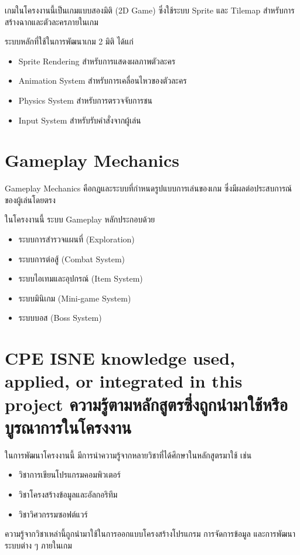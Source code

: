เกมในโครงงานนี้เป็นเกมแบบสองมิติ (2D Game) ซึ่งใช้ระบบ Sprite และ Tilemap สำหรับการสร้างฉากและตัวละครภายในเกม

ระบบหลักที่ใช้ในการพัฒนาเกม 2 มิติ ได้แก่

\begin{itemize}
\item Sprite Rendering สำหรับการแสดงผลภาพตัวละคร
\item Animation System สำหรับการเคลื่อนไหวของตัวละคร
\item Physics System สำหรับการตรวจจับการชน
\item Input System สำหรับรับคำสั่งจากผู้เล่น
\end{itemize}

\section{Gameplay Mechanics}

Gameplay Mechanics คือกฎและระบบที่กำหนดรูปแบบการเล่นของเกม ซึ่งมีผลต่อประสบการณ์ของผู้เล่นโดยตรง

ในโครงงานนี้ ระบบ Gameplay หลักประกอบด้วย

\begin{itemize}
\item ระบบการสำรวจแผนที่ (Exploration)
\item ระบบการต่อสู้ (Combat System)
\item ระบบไอเทมและอุปกรณ์ (Item System)
\item ระบบมินิเกม (Mini-game System)
\item ระบบบอส (Boss System)
\end{itemize}

\section{\ifenglish%
\ifcpe CPE \else ISNE \fi knowledge used, applied, or integrated in this project
\else%
ความรู้ตามหลักสูตรซึ่งถูกนำมาใช้หรือบูรณาการในโครงงาน
\fi
}

ในการพัฒนาโครงงานนี้ มีการนำความรู้จากหลายวิชาที่ได้ศึกษาในหลักสูตรมาใช้ เช่น

\begin{itemize}
\item วิชาการเขียนโปรแกรมคอมพิวเตอร์
\item วิชาโครงสร้างข้อมูลและอัลกอริทึม
\item วิชาวิศวกรรมซอฟต์แวร์
\end{itemize}

ความรู้จากวิชาเหล่านี้ถูกนำมาใช้ในการออกแบบโครงสร้างโปรแกรม การจัดการข้อมูล และการพัฒนาระบบต่าง ๆ ภายในเกม

